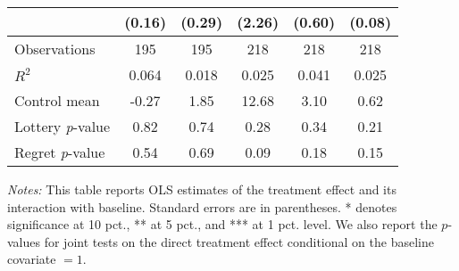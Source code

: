 \begin{table}[htbp]
{\begin{threeparttable}
\begin{tabular}{l*{5}{c}}
                &   (0.16)         &   (0.29)         &   (2.26)         &   (0.60)         &   (0.08)         \\
\midrule
Observations    &      195         &      195         &      218         &      218         &      218         \\
\(R^{2}\)       &    0.064         &    0.018         &    0.025         &    0.041         &    0.025         \\
Control mean    &    -0.27         &     1.85         &    12.68         &     3.10         &     0.62         \\
Lottery \emph{p}-value&     0.82         &     0.74         &     0.28         &     0.34         &     0.21         \\
Regret \emph{p}-value&     0.54         &     0.69         &     0.09         &     0.18         &     0.15         \\
\bottomrule \end{tabular} \begin{tablenotes}[flushleft] \footnotesize \item \emph{Notes:} This table reports OLS estimates of the treatment effect and its interaction with baseline. Standard errors are in parentheses. * denotes significance at 10 pct., ** at 5 pct., and *** at 1 pct. level. We also report the \(p\)-values for joint tests on the direct treatment effect conditional on the baseline covariate $= 1$. \end{tablenotes} \end{threeparttable} } \end{table}
